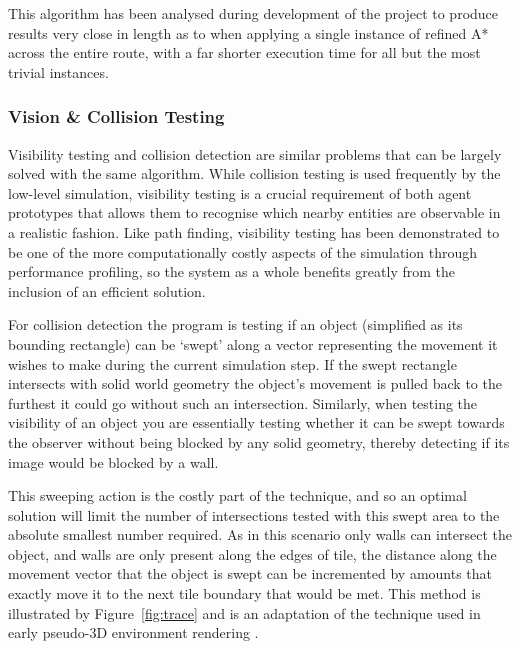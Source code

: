 \documentclass[a4paper,12pt]{article}
\begin{document}
This algorithm has been analysed during development of the project to produce results very close in length as to when applying a single instance of refined A* across the entire route, with a far shorter execution time for all but the most trivial instances.

\subsubsection{Vision \& Collision Testing}\noindent
Visibility testing and collision detection are similar problems that can be largely solved with the same algorithm. While collision testing is used frequently by the low-level simulation, visibility testing is a crucial requirement of both agent prototypes that allows them to recognise which nearby entities are observable in a realistic fashion. Like path finding, visibility testing has been demonstrated to be one of the more computationally costly aspects of the simulation through performance profiling, so the system as a whole benefits greatly from the inclusion of an efficient solution.

For collision detection the program is testing if an object (simplified as its bounding rectangle) can be `swept' along a vector representing the movement it wishes to make during the current simulation step. If the swept rectangle intersects with solid world geometry the object's movement is pulled back to the furthest it could go without such an intersection. Similarly, when testing the visibility of an object you are essentially testing whether it can be swept towards the observer without being blocked by any solid geometry, thereby detecting if its image would be blocked by a wall.

This sweeping action is the costly part of the technique, and so an optimal solution will limit the number of intersections tested with this swept area to the absolute smallest number required. As in this scenario only walls can intersect the object, and walls are only present along the edges of tile, the distance along the movement vector that the object is swept can be incremented by amounts that exactly move it to the next tile boundary that would be met. This method is illustrated by Figure~\ref{fig:trace} and is an adaptation of the technique used in early pseudo-3D environment rendering \cite{raycast}.
\end{document}
